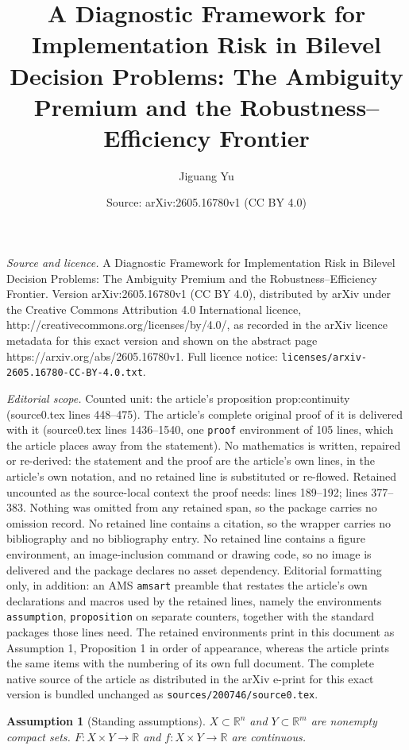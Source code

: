 \documentclass[10pt,a4paper]{amsart}
\title{A Diagnostic Framework for Implementation Risk in Bilevel Decision Problems: The Ambiguity Premium and the Robustness--Efficiency Frontier}
\author{Jiguang Yu}
\date{Source: arXiv:2605.16780v1 (CC BY 4.0)}
\newtheorem{assumption}{Assumption}
\newcommand{\R}{\mathbb{R}}
\begin{document}
\maketitle

\noindent\emph{Source and licence.} A Diagnostic Framework for Implementation Risk in Bilevel Decision Problems: The Ambiguity Premium and the Robustness--Efficiency Frontier. Version arXiv:2605.16780v1 (CC BY 4.0), distributed by arXiv under the Creative Commons Attribution 4.0 International licence, http://creativecommons.org/licenses/by/4.0/, as recorded in the arXiv licence metadata for this exact version and shown on the abstract page https://arxiv.org/abs/2605.16780v1. Full licence notice: \texttt{licenses/arxiv-2605.16780-CC-BY-4.0.txt}.\par\smallskip

\noindent\textit{Editorial scope.} Counted unit: the article's proposition prop:continuity (source0.tex lines 448--475). The article's complete original proof of it is delivered with it (source0.tex lines 1436--1540, one \texttt{proof} environment of 105 lines, which the article places away from the statement). No mathematics is written, repaired or re-derived: the statement and the proof are the article's own lines, in the article's own notation, and no retained line is substituted or re-flowed.  Retained uncounted as the source-local context the proof needs: lines 189--192; lines 377--383.  Nothing was omitted from any retained span, so the package carries no omission record.  No retained line contains a citation, so the wrapper carries no bibliography and no bibliography entry.  No retained line contains a figure environment, an image-inclusion command or drawing code, so no image is delivered and the package declares no asset dependency.  Editorial formatting only, in addition: an AMS \texttt{amsart} preamble that restates the article's own declarations and macros used by the retained lines, namely the environments \texttt{assumption}, \texttt{proposition} on separate counters, together with the standard packages those lines need.  The retained environments print in this document as Assumption 1, Proposition 1 in order of appearance, whereas the article prints the same items with the numbering of its own full document.  The complete native source of the article as distributed in the arXiv e-print for this exact version is bundled unchanged as \texttt{sources/200746/source0.tex}.
\begin{assumption}[Standing assumptions]\label{ass:standing}
$X\subset\R^n$ and $Y\subset\R^m$ are nonempty compact sets.
$F:X\times Y\to\R$ and $f:X\times Y\to\R$ are continuous.
\end{assumption}
\end{document}
